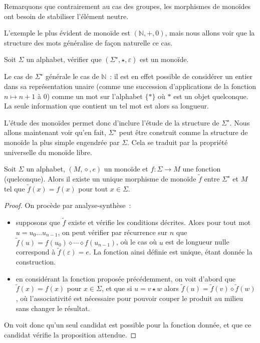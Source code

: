 Remarquons que contrairement au cas des groupes, les morphismes de monoïdes ont
besoin de stabiliser l'élément neutre.

L'exemple le plus évident de monoïde est $(\mathbb N,+,0)$, mais nous allons
voir que la structure des mots généralise de façon naturelle ce cas.

\begin{exercise}
  Soit $\Sigma$ un alphabet, vérifier que $(\Sigma^\star, \star,\varepsilon)$
  est un monoïde.
\end{exercise}

Le cas de $\Sigma^\star$ générale le cas de $\mathbb N$~: il est en effet
possible de considérer un entier dans sa représentation unaire (comme une
succession d'applications de la fonction $n \mapsto n + 1$ à $0$) comme un mot
sur l'alphabet $\{*\}$ où $*$ est un objet quelconque. La seule information
que contient un tel mot est alors sa longueur.

L'étude des monoïdes permet donc d'inclure l'étude de la structure de
$\Sigma^\star$. Nous allons maintenant voir qu'en fait, $\Sigma^\star$ peut être
construit comme la structure de monoïde la plus simple engendrée par $\Sigma$.
Cela se traduit par la propriété universelle du monoïde libre.

\begin{theorem}\label{thm.PU.monoid}
  Soit $\Sigma$ un alphabet, $(M,\diamond,e)$ un monoïde et $f : \Sigma \to M$
  une fonction (quelconque). Alors il existe un unique morphisme de monoïde
  $\tilde f$ entre $\Sigma^\star$ et $M$ tel que $\tilde f (x) = f(x)$ pour tout
  $x \in \Sigma$.
\end{theorem}

\begin{proof}
  On procède par analyse-synthèse~:
  \begin{itemize}
  \item supposons que $\tilde f$ existe et vérifie les conditions décrites.
    Alors pour tout mot $u = u_0\ldots u_{n-1}$, on peut vérifier par récurrence
    sur $n$ que $\tilde f(u) = f(u_0)\diamond \cdots \diamond f(u_{n-1})$, où
    le cas où $u$ est de longueur nulle correspond à
    $\tilde f(\varepsilon) = e$. La fonction ainsi définie est unique, étant
    donnée la construction.
  \item en considérant la fonction proposée précédemment, on voit d'abord que
    $\tilde f(x) = f(x)$ pour $x\in \Sigma$, et que si $u = v\star w$ alors
    $\tilde f(u) = \tilde f(v)\diamond \tilde f(w)$, où l'associativité est
    nécessaire pour pouvoir couper le produit au milieu sans changer le
    résultat.
  \end{itemize}
  On voit donc qu'un seul candidat est possible pour la fonction donnée, et que
  ce candidat vérifie la proposition attendue.
\end{proof}

